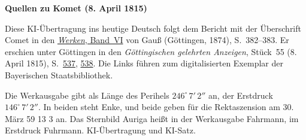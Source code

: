 \clearpage\thispagestyle{empty}
\begin{center}\textbf{Quellen zu Komet (8. April 1815)}\end{center}
\noindent Diese KI-Übertragung ins heutige Deutsch folgt dem Bericht mit der Überschrift Comet in den \href{https://gdz.sub.uni-goettingen.de/id/PPN236007467}{\textit{Werken}, Band~VI} von Gauß (Göttingen, 1874), S.~382--383. Er erschien unter Göttingen in den \textit{Göttingischen gelehrten Anzeigen}, Stück~55 (8. April 1815), S.~\href{https://api.digitale-sammlungen.de/iiif/image/v2/bsb10538686_00545/full/1600,/0/default.jpg}{537}, \href{https://api.digitale-sammlungen.de/iiif/image/v2/bsb10538686_00546/full/1600,/0/default.jpg}{538}. Die Links führen zum digitalisierten Exemplar der Bayerischen Staatsbibliothek.
\par\smallskip\noindent Die Werkausgabe gibt als Länge des Perihels $246^\circ\,7'\,2''$ an, der Erstdruck $146^\circ\,7'\,2''$. In beiden steht Enke, und beide geben für die Rektaszension am 30. März 59 13 3 an. Das Sternbild Auriga heißt in der Werkausgabe Fahrmann, im Erstdruck Fuhrmann. KI-Übertragung und KI-Satz.
\clearpage
